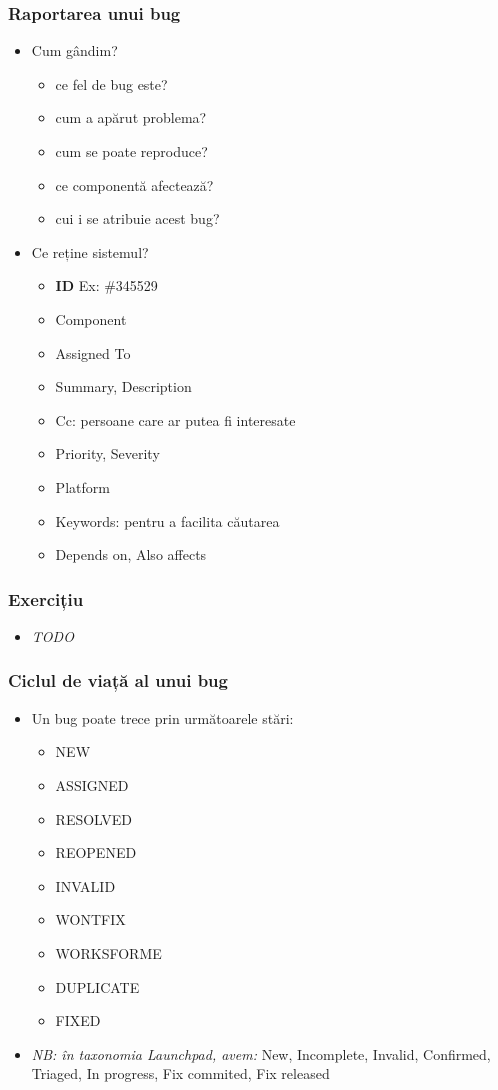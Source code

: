 \documentclass{beamer}
\begin{document}
\begin{frame}
\frametitle{Raportarea unui bug}
\begin{itemize}
\item Cum gândim?
\begin{itemize}
\pause \item ce fel de bug este?
\pause \item cum a apărut problema?
\pause \item cum se poate reproduce?
\pause \item ce componentă afectează?
\pause \item cui i se atribuie acest bug? %
\end{itemize}
\pause \item Ce reține sistemul?
\begin{itemize}
\item \textbf{ID} Ex: \#345529
\item Component
\item Assigned To
\item Summary, Description
\item Cc: persoane care ar putea fi interesate
\item Priority, Severity
\item Platform
\item Keywords: pentru a facilita căutarea
\item Depends on, Also affects
\end{itemize}
\end{itemize}
\end{frame}

\begin{frame}
\frametitle{Exercițiu}
\begin{itemize}
\item \emph{TODO}
\end{itemize}
\end{frame}

\begin{frame}
\frametitle{Ciclul de viață al unui bug}
\begin{itemize}
\item Un bug poate trece prin următoarele stări:
\begin{itemize}
\item NEW
\item ASSIGNED
\item RESOLVED
\item REOPENED
\item INVALID
\item WONTFIX
\item WORKSFORME
\item DUPLICATE
\item FIXED
\end{itemize}
\pause \item \emph{NB: în taxonomia Launchpad, avem:} New, Incomplete, Invalid, Confirmed, Triaged, In progress, Fix commited, Fix released
\end{itemize}
\end{frame}
\end{document}
